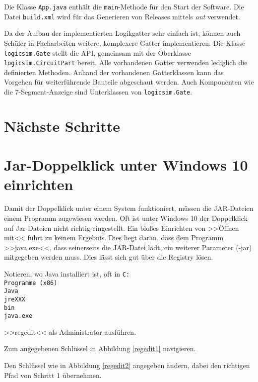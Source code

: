 \documentclass[12pt]{scrartcl}
\begin{document}
Die Klasse \texttt{App.java} enthält die \texttt{main}-Methode für den Start der Software.
Die Datei \texttt{build.xml} wird für das Generieren von Releases mittels \textit{ant} verwendet.

Da der Aufbau der implementierten Logikgatter sehr einfach ist, können auch Schüler in Facharbeiten weitere, komplexere Gatter implementieren. Die Klasse \texttt{logicsim.Gate} stellt die API, gemeinsam mit der Oberklasse \texttt{logicsim.CircuitPart} bereit. Alle vorhandenen Gatter verwenden lediglich die definierten Methoden. Anhand der vorhandenen Gatterklassen kann das Vorgehen für weiterführende Bauteile abgeschaut werden. Auch Komponenten wie die 7-Segment-Anzeige sind Unterklassen von \texttt{logicsim.Gate}.\\

\section{Nächste Schritte}

\appendix
\section{Jar-Doppelklick unter Windows 10 einrichten}
Damit der Doppelklick unter einem System funktioniert, müssen die JAR-Dateien einem Programm zugewiesen werden. Oft ist unter Windows 10 der Doppelklick auf Jar-Dateien nicht richtig eingestellt. Ein bloßes Einrichten von >>Öffnen mit<< führt zu keinem Ergebnis. Dies liegt daran, dass dem Programm >>java.exe<<, dass seinerseits die JAR-Datei lädt, ein weiterer Parameter (-jar) mitgegeben werden muss. Dies lässt sich gut über die Registry lösen.
\begin{compactenum}
\item Notieren, wo Java installiert ist, oft in \texttt{C:\\Programme (x86)\\Java\\jreXXX\\bin\\java.exe}
\item >>regedit<< als Administrator ausführen.
\item Zum angegebenen Schlüssel in Abbildung \ref{regedit1} navigieren.
\item Den Schlüssel wie in Abbildung \ref{regedit2} angegeben ändern, dabei den richtigen Pfad von Schritt 1 übernehmen.
\end{compactenum}
\end{document}
